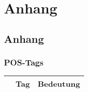 
\appendix     
\part*{Anhang} %
   
    
\chapter{Anhang} 

\section{POS-Tags}

\begin{table}[h!]
 
  \begin{tabular}{|l|l|l|} 
      \toprule
    & Tag & Bedeutung\\
    \midrule


\end{tabular}
\end{table}
